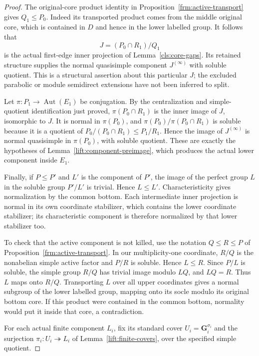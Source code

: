 \begin{proof}
The original-core product identity in
Proposition~\ref{frm:active-transport} gives $Q_1\leq P_0$.
Indeed its transported product comes from the middle original core,
which is contained in $D$ and hence in the lower labelled group.
It follows that
\[
 J=(P_0\cap R_1)/Q_1
\]
is the actual first-edge inner projection of
Lemma~\ref{cls:core-gaps}.  Its retained structure supplies the
normal quasisimple component $J^{(\infty)}$ with soluble quotient.
This is a structural assertion about this particular $J$; the
excluded parabolic or module semidirect extensions have not been
inferred to split.

Let $\pi:P_1\to\operatorname{Aut}(E_1)$ be conjugation.  By the
centralization and simple-quotient identification just proved,
$\pi(P_0\cap R_1)$ is the inner image of $J$, isomorphic to $J$.
It is normal in $\pi(P_0)$, and
$\pi(P_0)/\pi(P_0\cap R_1)$ is soluble because it is a quotient of
$P_0/(P_0\cap R_1)\leq P_1/R_1$.
Hence the image of $J^{(\infty)}$ is normal quasisimple in
$\pi(P_0)$, with soluble quotient.  These are exactly the hypotheses
of Lemma~\ref{lift:component-preimage}, which produces the actual
lower component inside $E_1$.

Finally, if $P\leq P'$ and $L'$ is the
component of $P'$, the image of the perfect group $L$ in the soluble
group $P'/L'$ is trivial.  Hence $L\leq L'$.  Characteristicity gives
normalization by the common bottom.  Each intermediate inner
projection is normal in its own coordinate stabilizer, which contains
the lower coordinate stabilizer; its characteristic component is
therefore normalized by that lower stabilizer too.

To check that the active component is not killed, use the notation
$Q\leq R\leq P$ of Proposition~\ref{frm:active-transport}.  In our
multiplicity-one coordinate, $R/Q$ is the nonabelian simple active
factor and $P/R$ is soluble.  Hence $L\leq R$.  Since $P/L$ is
soluble, the simple group $R/Q$ has trivial image modulo $LQ$, and
$LQ=R$.  Thus $L$ maps onto $R/Q$.  Transporting $L$ over all upper
coordinates gives a normal subgroup of the lower labelled group,
mapping onto its socle modulo its original bottom core.  If this
product were contained in the common bottom, normality would put it
inside that core, a contradiction.

For each actual finite component $L_i$, fix its standard cover
$U_i=\mathbf G_i^{\sigma_i}$ and the surjection
$\pi_i:U_i\twoheadrightarrow L_i$ of
Lemma~\ref{lift:finite-covers}, over the specified simple quotient.


\end{proof}
